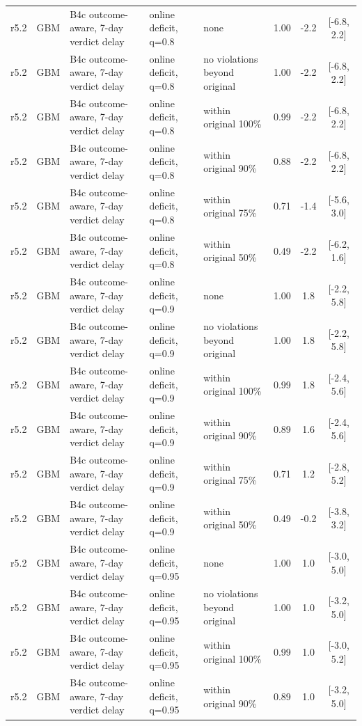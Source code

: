 \documentclass[10pt,onecolumn,letterpaper]{article}
\begin{document}
\begin{longtable}{lllp{4.2cm}p{3.4cm}ccc}
r5.2 & GBM & B4c outcome-aware, 7-day verdict delay & online deficit, q=0.8 & none & 1.00 & -2.2 & [-6.8, 2.2] \\
r5.2 & GBM & B4c outcome-aware, 7-day verdict delay & online deficit, q=0.8 & no violations beyond original & 1.00 & -2.2 & [-6.8, 2.2] \\
r5.2 & GBM & B4c outcome-aware, 7-day verdict delay & online deficit, q=0.8 & within original 100\% & 0.99 & -2.2 & [-6.8, 2.2] \\
r5.2 & GBM & B4c outcome-aware, 7-day verdict delay & online deficit, q=0.8 & within original 90\% & 0.88 & -2.2 & [-6.8, 2.2] \\
r5.2 & GBM & B4c outcome-aware, 7-day verdict delay & online deficit, q=0.8 & within original 75\% & 0.71 & -1.4 & [-5.6, 3.0] \\
r5.2 & GBM & B4c outcome-aware, 7-day verdict delay & online deficit, q=0.8 & within original 50\% & 0.49 & -2.2 & [-6.2, 1.6] \\
r5.2 & GBM & B4c outcome-aware, 7-day verdict delay & online deficit, q=0.9 & none & 1.00 & 1.8 & [-2.2, 5.8] \\
r5.2 & GBM & B4c outcome-aware, 7-day verdict delay & online deficit, q=0.9 & no violations beyond original & 1.00 & 1.8 & [-2.2, 5.8] \\
r5.2 & GBM & B4c outcome-aware, 7-day verdict delay & online deficit, q=0.9 & within original 100\% & 0.99 & 1.8 & [-2.4, 5.6] \\
r5.2 & GBM & B4c outcome-aware, 7-day verdict delay & online deficit, q=0.9 & within original 90\% & 0.89 & 1.6 & [-2.4, 5.6] \\
r5.2 & GBM & B4c outcome-aware, 7-day verdict delay & online deficit, q=0.9 & within original 75\% & 0.71 & 1.2 & [-2.8, 5.2] \\
r5.2 & GBM & B4c outcome-aware, 7-day verdict delay & online deficit, q=0.9 & within original 50\% & 0.49 & -0.2 & [-3.8, 3.2] \\
r5.2 & GBM & B4c outcome-aware, 7-day verdict delay & online deficit, q=0.95 & none & 1.00 & 1.0 & [-3.0, 5.0] \\
r5.2 & GBM & B4c outcome-aware, 7-day verdict delay & online deficit, q=0.95 & no violations beyond original & 1.00 & 1.0 & [-3.2, 5.0] \\
r5.2 & GBM & B4c outcome-aware, 7-day verdict delay & online deficit, q=0.95 & within original 100\% & 0.99 & 1.0 & [-3.0, 5.2] \\
r5.2 & GBM & B4c outcome-aware, 7-day verdict delay & online deficit, q=0.95 & within original 90\% & 0.89 & 1.0 & [-3.2, 5.0] \\

\end{longtable}
\end{document}
